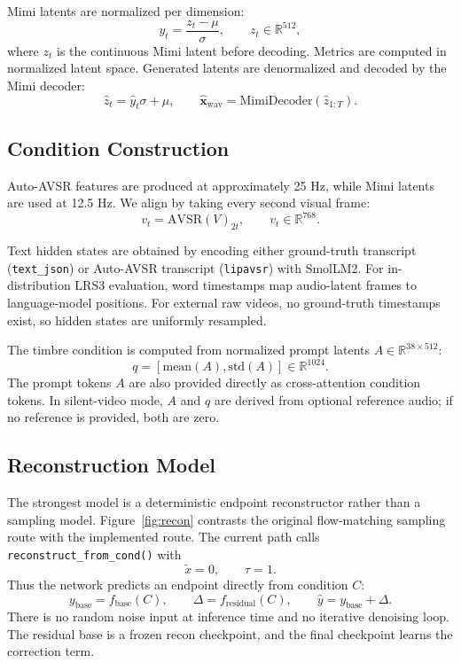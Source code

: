 \documentclass{article}
\begin{document}
Mimi latents are normalized per dimension:
\begin{equation}
    y_t = \frac{z_t - \mu}{\sigma}, \qquad z_t \in \mathbb{R}^{512},
\end{equation}
where $z_t$ is the continuous Mimi latent before decoding. Metrics are computed
in normalized latent space. Generated latents are denormalized and decoded by
the Mimi decoder:
\begin{equation}
    \hat{z}_t = \hat{y}_t \sigma + \mu, \qquad
    \hat{\mathbf{x}}_{\mathrm{wav}} = \mathrm{MimiDecoder}(\hat{z}_{1:T}).
\end{equation}

\subsection{Condition Construction}

Auto-AVSR features are produced at approximately 25 Hz, while Mimi latents are
used at 12.5 Hz. We align by taking every second visual frame:
\begin{equation}
    v_t = \mathrm{AVSR}(V)_{2t}, \qquad v_t \in \mathbb{R}^{768}.
\end{equation}

Text hidden states are obtained by encoding either ground-truth transcript
(\texttt{text\_json}) or Auto-AVSR transcript (\texttt{lipavsr}) with SmolLM2.
For in-distribution LRS3 evaluation, word timestamps map audio-latent frames to
language-model positions. For external raw videos, no ground-truth timestamps
exist, so hidden states are uniformly resampled.

The timbre condition is computed from normalized prompt latents $A \in
\mathbb{R}^{38 \times 512}$:
\begin{equation}
    q = [\mathrm{mean}(A), \mathrm{std}(A)] \in \mathbb{R}^{1024}.
\end{equation}
The prompt tokens $A$ are also provided directly as cross-attention condition
tokens. In silent-video mode, $A$ and $q$ are derived from optional reference
audio; if no reference is provided, both are zero.

\subsection{Reconstruction Model}

The strongest model is a deterministic endpoint reconstructor rather than a
sampling model. Figure~\ref{fig:recon} contrasts the original flow-matching
sampling route with the implemented route. The current path calls
\texttt{reconstruct\_from\_cond()} with
\begin{equation}
    \tilde{x} = 0,\qquad \tau = 1.
\end{equation}
Thus the network predicts an endpoint directly from condition $C$:
\begin{equation}
    y_{\mathrm{base}} = f_{\mathrm{base}}(C), \qquad
    \Delta = f_{\mathrm{residual}}(C), \qquad
    \hat{y} = y_{\mathrm{base}} + \Delta.
\end{equation}
There is no random noise input at inference time and no iterative denoising
loop. The residual base is a frozen recon checkpoint, and the final checkpoint
learns the correction term.
\end{document}
